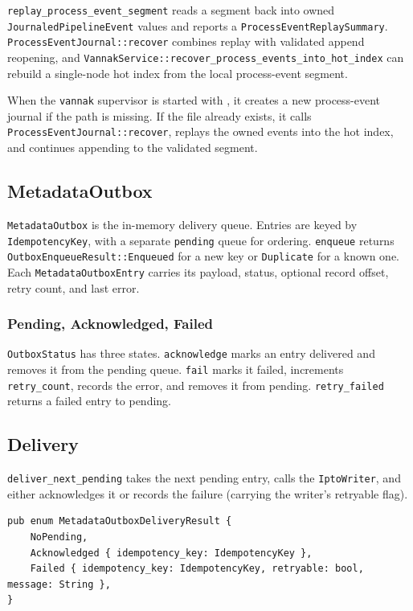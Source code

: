 \texttt{replay\_process\_event\_segment} reads a segment back into owned
\texttt{JournaledPipelineEvent} values and reports a
\texttt{ProcessEventReplaySummary}. \texttt{ProcessEventJournal::recover}
combines replay with validated append reopening, and
\texttt{VannakService::recover\_process\_events\_into\_hot\_index} can rebuild a
single-node hot index from the local process-event segment.

When the \texttt{vannak} supervisor is started with ,
it creates a new process-event journal if the path is missing. If the file
already exists, it calls \texttt{ProcessEventJournal::recover}, replays the
owned events into the hot index, and continues appending to the validated
segment.

\subsection{MetadataOutbox}

\texttt{MetadataOutbox} is the in-memory delivery queue. Entries are keyed by
\texttt{IdempotencyKey}, with a separate \texttt{pending} queue for ordering.
\texttt{enqueue} returns \texttt{OutboxEnqueueResult::Enqueued} for a new key or
\texttt{Duplicate} for a known one. Each \texttt{MetadataOutboxEntry} carries its
payload, status, optional record offset, retry count, and last error.

\subsubsection{Pending, Acknowledged, Failed}

\texttt{OutboxStatus} has three states. \texttt{acknowledge} marks an entry
delivered and removes it from the pending queue. \texttt{fail} marks it failed,
increments \texttt{retry\_count}, records the error, and removes it from
pending. \texttt{retry\_failed} returns a failed entry to pending.

\subsection{Delivery}

\texttt{deliver\_next\_pending} takes the next pending entry, calls the
\texttt{IptoWriter}, and either acknowledges it or records the failure (carrying
the writer's retryable flag).

\begin{lstlisting}
pub enum MetadataOutboxDeliveryResult {
    NoPending,
    Acknowledged { idempotency_key: IdempotencyKey },
    Failed { idempotency_key: IdempotencyKey, retryable: bool, message: String },
}
\end{lstlisting}

